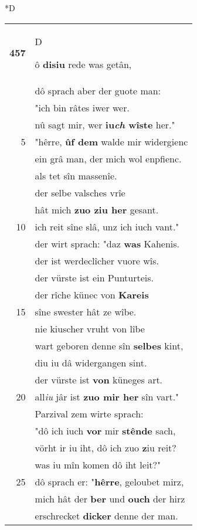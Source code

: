 \documentclass[8pt,a4paper,notitlepage]{article}
\begin{document}
\begin{table}[ht]
\begin{minipage}[t]{0.5\linewidth}
\small
\begin{center}*D
\end{center}
\begin{tabular}{rl}
\textbf{457} & \begin{large}D\end{large}ô \textbf{disiu} rede was getân,\\ 
 & dô sprach aber der guote man:\\ 
 & "ich bin râtes iwer wer.\\ 
 & nû sagt mir, wer \textbf{iu\textit{ch} wîste} her."\\ 
5 & "hêrre, \textbf{ûf dem} walde mir widergienc\\ 
 & ein grâ man, der mich wol enpfienc.\\ 
 & als tet sîn massenîe.\\ 
 & der selbe valsches vrîe\\ 
 & hât mich \textbf{zuo ziu her} gesant.\\ 
10 & ich reit sîne slâ, unz ich iuch vant."\\ 
 & der wirt sprach: "daz \textbf{was} Kahenis.\\ 
 & der ist werdeclîcher vuore wîs.\\ 
 & der vürste ist ein Punturteis.\\ 
 & der rîche künec von \textbf{Kareis}\\ 
15 & sîne swester hât ze wîbe.\\ 
 & nie kiuscher vruht von lîbe\\ 
 & wart geboren denne sîn \textbf{selbes} kint,\\ 
 & diu iu dâ widergangen sint.\\ 
 & der vürste ist \textbf{von} küneges art.\\ 
20 & all\textit{iu} jâr ist \textbf{zuo mir her} sîn vart."\\ 
 & Parzival zem wirte sprach:\\ 
 & "dô ich iuch \textbf{vor} mir \textbf{stênde} sach,\\ 
 & vörht ir iu iht, dô ich zuo \textbf{z}iu reit?\\ 
 & was iu mîn komen dô iht leit?"\\ 
25 & dô sprach er: "\textbf{hêrre}, geloubet mirz,\\ 
 & mich hât der \textbf{ber} und \textbf{ouch} der hirz\\ 
 & erschrecket \textbf{dicker} denne der man.\\ 

\end{tabular}
\end{minipage}
\end{table}
\end{document}
